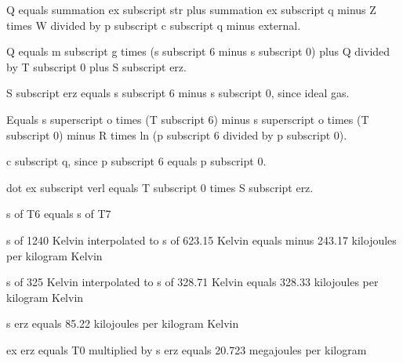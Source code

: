 Q equals summation ex subscript str plus summation ex subscript q minus Z times W divided by p subscript c subscript q minus external.  

Q equals m subscript g times (s subscript 6 minus s subscript 0) plus Q divided by T subscript 0 plus S subscript erz.  

S subscript erz equals s subscript 6 minus s subscript 0, since ideal gas.  

Equals s superscript o times (T subscript 6) minus s superscript o times (T subscript 0) minus R times ln (p subscript 6 divided by p subscript 0).  

c subscript q, since p subscript 6 equals p subscript 0.  

dot ex subscript verl equals T subscript 0 times S subscript erz.

s of T6 equals s of T7  

s of 1240 Kelvin interpolated to s of 623.15 Kelvin equals minus 243.17 kilojoules per kilogram Kelvin  

s of 325 Kelvin interpolated to s of 328.71 Kelvin equals 328.33 kilojoules per kilogram Kelvin  

s erz equals 85.22 kilojoules per kilogram Kelvin  

ex erz equals T0 multiplied by s erz equals 20.723 megajoules per kilogram